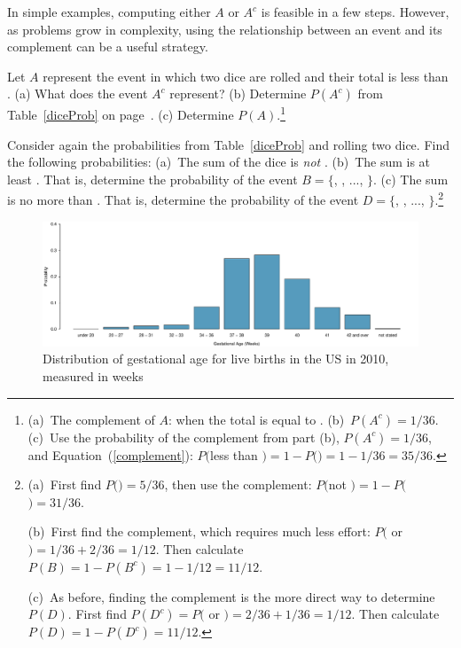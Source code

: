 In simple examples, computing either $A$ or $A^c$ is feasible in a few steps. However, as problems grow in complexity, using the relationship between an event and its complement can be a useful strategy.

\begin{exercise}
Let $A$ represent the event in which two dice are rolled and their total is less than . (a) What does the event $A^c$ represent? (b) Determine $P(A^c)$ from Table~\ref{diceProb} on page~\pageref{diceProb}. (c) Determine $P(A)$.\footnote{(a)~The complement of $A$: when the total is equal to . (b)~$P(A^c) = 1/36$. (c)~Use the probability of the complement from part (b), $P(A^c) = 1/36$, and Equation~(\ref{complement}): $P($less than $) = 1 - P($$) = 1 - 1/36 = 35/36$.}
\end{exercise}

\begin{exercise} Consider again the probabilities from Table~\ref{diceProb} and rolling two dice. Find the following probabilities: (a)~The sum of the dice is \emph{not} . (b)~The sum is at least . That is, determine the probability of the event $B=\{$, , ..., $\}$. (c) The sum is no more than . That is, determine the probability of the event $D=\{$, , ..., $\}$.\footnote{(a)~First find $P($$)=5/36$, then use the complement: $P($not $) = 1 - P($$) = 31/36$.

(b)~First find  the complement, which requires much less effort: $P($ or $)=1/36+2/36=1/12$. Then calculate $P(B) = 1-P(B^c) = 1-1/12 = 11/12$.

(c)~As before, finding the complement is the more direct way to determine $P(D)$. First find $P(D^c) = P($ or $)=2/36 + 1/36=1/12$. Then calculate $P(D) = 1 - P(D^c) = 11/12$.}
\end{exercise}



\begin{figure}
	\begin{center}
		\includegraphics[width=\textwidth]{ch_probability_oi_biostat/figures/gestageMarginalDist/gestageMarginalDist.pdf}
		\caption{Distribution of gestational age for live births in the US in 2010, measured in weeks}
		\label{fig:gestageMarginalDist}
	\end{center}
\end{figure}


